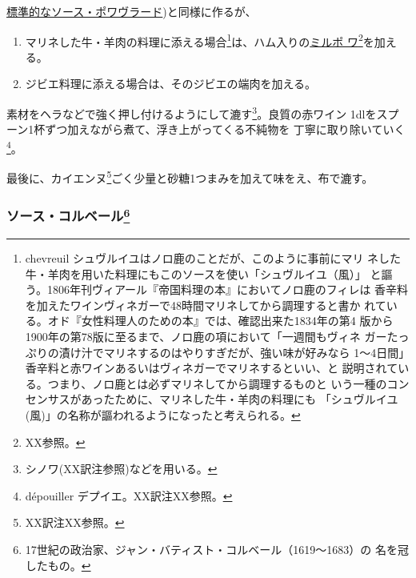\begin{recette}
    

\protect\hyperlink{sauce-poivrade}{標準的なソース・ポワヴラード})と同様に作るが、

\begin{enumerate}
\def\labelenumi{\arabic{enumi}.}
\item
  マリネした牛・羊肉の料理に添える場合\footnote{chevreuil
    シュヴルイユはノロ鹿のことだが、このように事前にマリ
    ネした牛・羊肉を用いた料理にもこのソースを使い「シュヴルイユ（風）」
    と謳う。1806年刊ヴィアール『帝国料理の本』においてノロ鹿のフィレは
    香辛料を加えたワインヴィネガーで48時間マリネしてから調理すると書か
    れている。オド『女性料理人のための本』では、確認出来た1834年の第4
    版から1900年の第78版に至るまで、ノロ鹿の項において「一週間もヴィネ
    ガーたっぷりの漬け汁でマリネするのはやりすぎだが、強い味が好みなら
    1〜4日間」香辛料と赤ワインあるいはヴィネガーでマリネするといい、と
    説明されている。つまり、ノロ鹿とは必ずマリネしてから調理するものと
    いう一種のコンセンサスがあったために、マリネした牛・羊肉の料理にも
    「シュヴルイユ(風)」の名称が謳われるようになったと考えられる。}は、ハム入りの\protect\hyperlink{mirepoix}{ミルポ
  ワ}\footnote{XX参照。}を加える。
\item
  ジビエ料理に添える場合は、そのジビエの端肉を加える。
\end{enumerate}

素材をヘラなどで強く押し付けるようにして漉す\footnote{シノワ(XX訳注参照)などを用いる。}。良質の赤ワイン
1\undemi{}dlをスプーン1杯ずつ加えながら煮て、浮き上がってくる不純物を
丁寧に取り除いていく\footnote{dépouiller デプイエ。XX訳注XX参照。}。

最後に、カイエンヌ\footnote{XX訳注XX参照。}ごく少量と砂糖1つまみを加えて味をえ、布で漉す。

\maeaki

\hypertarget{ux30bdux30fcux30b9ux30b3ux30ebux30d9ux30fcux30eb23}{%
\subsubsection[ソース・コルベール]{\texorpdfstring{ソース・コルベール\footnote{17世紀の政治家、ジャン・バティスト・コルベール（1619〜1683）の
  名を冠したもの。}}{ソース・コルベール}}\label{ux30bdux30fcux30b9ux30b3ux30ebux30d9ux30fcux30eb23}}


\end{recette}
